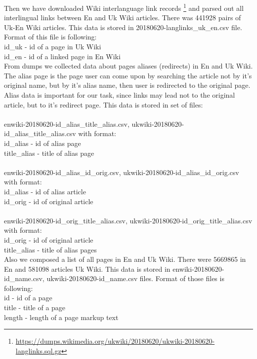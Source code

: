 \documentclass[11pt,a4paper]{article}
\begin{document}
Then we have downloaded Wiki interlanguage link records \footnote{\url{https://dumps.wikimedia.org/ukwiki/20180620/ukwiki-20180620-langlinks.sql.gz}} and parsed out all interlingual links between En and Uk Wiki articles. There was 441928 pairs of Uk-En Wiki articles. This data is stored in 20180620-langlinks\_uk\_en.csv file. Format of this file is following:\\
id\_uk - id of a page in Uk Wiki\\
id\_en - id of a linked page in En Wiki\\

From dumps we collected data about pages aliases (redirects) in En and Uk Wiki. The alias page is the page user can come upon by searching the article not by it's original name, but by it's alias name, then user is redirected to the original page. Alias data is important for our task, since links may lead not to the original article, but to it's redirect page. This data is stored in set of files:\\
\\
enwiki-20180620-id\_alias\_title\_alias.csv, ukwiki-20180620-id\_alias\_title\_alias.csv with format:\\
id\_alias - id of alias page\\
title\_alias - title of alias page\\
\\
enwiki-20180620-id\_alias\_id\_orig.csv, ukwiki-20180620-id\_alias\_id\_orig.csv with format:\\
id\_alias - id of alias article\\
id\_orig - id of original article\\
\\
enwiki-20180620-id\_orig\_title\_alias.csv, ukwiki-20180620-id\_orig\_title\_alias.csv with format:\\
id\_orig - id of original article\\
title\_alias - title of alias pages\\

Also we composed a list of all pages in En and Uk Wiki. There were 5669865 in En and 581098 articles Uk Wiki. This data is stored in enwiki-20180620-id\_name.csv, ukwiki-20180620-id\_name.csv files. Format of those files is following:\\ 
id - id of a page\\
title - title of a page\\
length - length of a page markup text\\
\end{document}
